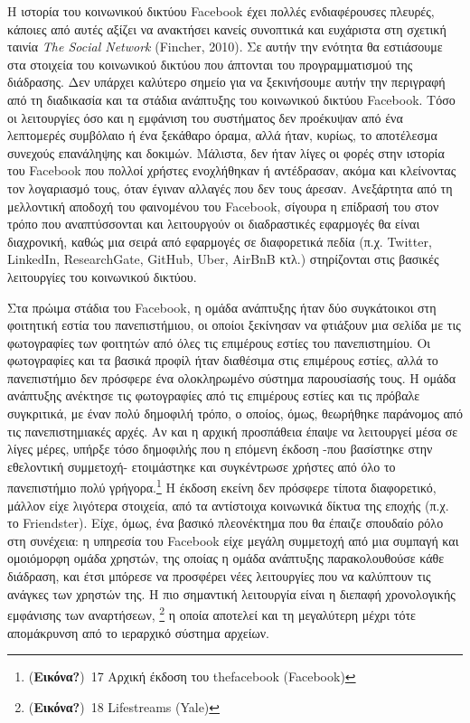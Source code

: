 \documentclass[
]{article}
\begin{document}
Η ιστορία του κοινωνικού δικτύου Facebook έχει πολλές ενδιαφέρουσες
πλευρές, κάποιες από αυτές αξίζει να ανακτήσει κανείς συνοπτικά και
ευχάριστα στη σχετική ταινία \emph{The Social Network} (Fincher, 2010).
Σε αυτήν την ενότητα θα εστιάσουμε στα στοιχεία του κοινωνικού δικτύου
που άπτονται του προγραμματισμού της διάδρασης. Δεν υπάρχει καλύτερο
σημείο για να ξεκινήσουμε αυτήν την περιγραφή από τη διαδικασία και τα
στάδια ανάπτυξης του κοινωνικού δικτύου Facebook. Τόσο οι λειτουργίες
όσο και η εμφάνιση του συστήματος δεν προέκυψαν από ένα λεπτομερές
συμβόλαιο ή ένα ξεκάθαρο όραμα, αλλά ήταν, κυρίως, το αποτέλεσμα
συνεχούς επανάληψης και δοκιμών. Μάλιστα, δεν ήταν λίγες οι φορές στην
ιστορία του Facebook που πολλοί χρήστες ενοχλήθηκαν ή αντέδρασαν, ακόμα
και κλείνοντας τον λογαριασμό τους, όταν έγιναν αλλαγές που δεν τους
άρεσαν. Ανεξάρτητα από τη μελλοντική αποδοχή του φαινομένου του
Facebook, σίγουρα η επίδρασή του στον τρόπο που αναπτύσσονται και
λειτουργούν οι διαδραστικές εφαρμογές θα είναι διαχρονική, καθώς μια
σειρά από εφαρμογές σε διαφορετικά πεδία (π.χ. Twitter, LinkedIn,
ResearchGate, GitHub, Uber, AirBnB κτλ.) στηρίζονται στις βασικές
λειτουργίες του κοινωνικού δικτύου.

Στα πρώιμα στάδια του Facebook, η ομάδα ανάπτυξης ήταν δύο συγκάτοικοι
στη φοιτητική εστία του πανεπιστήμιου, οι οποίοι ξεκίνησαν να φτιάξουν
μια σελίδα με τις φωτογραφίες των φοιτητών από όλες τις επιμέρους εστίες
του πανεπιστημίου. Οι φωτογραφίες και τα βασικά προφίλ ήταν διαθέσιμα
στις επιμέρους εστίες, αλλά το πανεπιστήμιο δεν πρόσφερε ένα
ολοκληρωμένο σύστημα παρουσίασής τους. Η ομάδα ανάπτυξης ανέκτησε τις
φωτογραφίες από τις επιμέρους εστίες και τις πρόβαλε συγκριτικά, με έναν
πολύ δημοφιλή τρόπο, ο οποίος, όμως, θεωρήθηκε παράνομος από τις
πανεπιστημιακές αρχές. Αν και η αρχική προσπάθεια έπαψε να λειτουργεί
μέσα σε λίγες μέρες, υπήρξε τόσο δημοφιλής που η επόμενη έκδοση -που
βασίστηκε στην εθελοντική συμμετοχή- ετοιμάστηκε και συγκέντρωσε χρήστες
από όλο το πανεπιστήμιο πολύ γρήγορα.\footnote{(\textbf{Εικόνα?})~17
  Αρχική έκδοση του thefacebook (Facebook)} Η έκδοση εκείνη δεν πρόσφερε
τίποτα διαφορετικό, μάλλον είχε λιγότερα στοιχεία, από τα αντίστοιχα
κοινωνικά δίκτυα της εποχής (π.χ. το Friendster). Είχε, όμως, ένα βασικό
πλεονέκτημα που θα έπαιζε σπουδαίο ρόλο στη συνέχεια: η υπηρεσία του
Facebook είχε μεγάλη συμμετοχή από μια συμπαγή και ομοιόμορφη ομάδα
χρηστών, της οποίας η ομάδα ανάπτυξης παρακολουθούσε κάθε διάδραση, και
έτσι μπόρεσε να προσφέρει νέες λειτουργίες που να καλύπτουν τις ανάγκες
των χρηστών της. Η πιο σημαντική λειτουργία είναι η διεπαφή χρονολογικής
εμφάνισης των αναρτήσεων, \footnote{(\textbf{Εικόνα?})~18 Lifestreams
  (Yale)} η οποία αποτελεί και τη μεγαλύτερη μέχρι τότε απομάκρυνση από
το ιεραρχικό σύστημα αρχείων.
\end{document}
